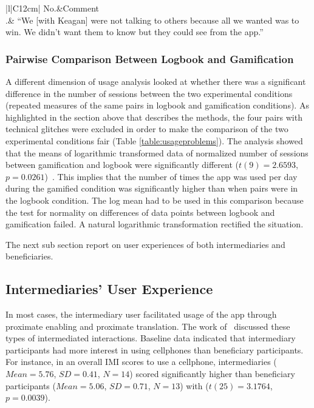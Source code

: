 \begin{table}[h!]
\renewcommand{\baselinestretch}{1.5}
  \begin{center}
    \caption{Excerpt: an example of introjected regulation.}
    \label{table:introject_reg}
	\begin{tabular}{|l|C{12cm}|}
		\hline
		No.&Comment\\
		.& {``We [with Keagan] were not talking to others because all we wanted was to win. We didn't want them to know but they could see from the app.''}~\citep{katule2016family}\\
		\hline
	\end{tabular}
  \end{center}
\end{table} 

\subsubsection{Pairwise Comparison Between Logbook and Gamification}\label{dim3}
A different dimension of usage analysis looked at whether there was a significant difference in the number of sessions between the two experimental conditions (repeated measures of the same pairs in logbook and gamification conditions). As highlighted in the section above that describes the methods, the four pairs with technical glitches were excluded in order to make the comparison of the two experimental conditions fair (Table \ref{table:usageproblems}). The analysis showed that the means of logarithmic transformed data of normalized number of sessions between gamification and logbook were significantly different ($t(9)=2.6593$, $p=0.0261$)~\citep{katule2016family}. This implies that the number of times the app was used per day during the gamified condition was significantly higher than when pairs were in the logbook condition. The log mean had to be used in this comparison because the test for normality on differences of data points between logbook and gamification failed. A natural logarithmic transformation rectified the situation.

The next sub section report on user experiences of both intermediaries and beneficiaries.
\subsection{Intermediaries' User Experience}\label{interm_user_xp}
In most cases, the intermediary user facilitated usage of the app through proximate enabling and proximate translation. The work of~\cite{sambasivan2010} discussed these types of intermediated interactions. Baseline data indicated that intermediary participants had more interest in using cellphones than beneficiary participants. For instance, in an overall IMI scores to use a cellphone, intermediaries ($Mean=5.76$, $SD=0.41$, $N=14$) scored  significantly higher than beneficiary participants ($Mean=5.06$, $SD= 0.71$, $N=13$) with ($t(25)=3.1764$, $p=0.0039$).

